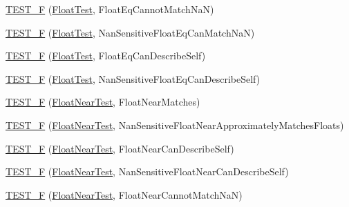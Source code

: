 \begin{DoxyCompactItemize}
\item 
\mbox{\hyperlink{namespacetesting_1_1gmock__matchers__test_a111f0c8a5ec17b47e8eb6226e1c2cb58}{T\+E\+S\+T\+\_\+F}} (\mbox{\hyperlink{namespacetesting_1_1gmock__matchers__test_a145329e433869625f9f0e98a0cdfd7b4}{Float\+Test}}, Float\+Eq\+Cannot\+Match\+NaN)
\item 
\mbox{\hyperlink{namespacetesting_1_1gmock__matchers__test_a4e9d89902e088a10915b4f9463ac0f09}{T\+E\+S\+T\+\_\+F}} (\mbox{\hyperlink{namespacetesting_1_1gmock__matchers__test_a145329e433869625f9f0e98a0cdfd7b4}{Float\+Test}}, Nan\+Sensitive\+Float\+Eq\+Can\+Match\+NaN)
\item 
\mbox{\hyperlink{namespacetesting_1_1gmock__matchers__test_a264de01a5019e5c358116845bf5edd14}{T\+E\+S\+T\+\_\+F}} (\mbox{\hyperlink{namespacetesting_1_1gmock__matchers__test_a145329e433869625f9f0e98a0cdfd7b4}{Float\+Test}}, Float\+Eq\+Can\+Describe\+Self)
\item 
\mbox{\hyperlink{namespacetesting_1_1gmock__matchers__test_a95a2bbc273ff70fc364c5c9c4697834c}{T\+E\+S\+T\+\_\+F}} (\mbox{\hyperlink{namespacetesting_1_1gmock__matchers__test_a145329e433869625f9f0e98a0cdfd7b4}{Float\+Test}}, Nan\+Sensitive\+Float\+Eq\+Can\+Describe\+Self)
\item 
\mbox{\hyperlink{namespacetesting_1_1gmock__matchers__test_a6897409da5003f20f891d8a5ecabdc99}{T\+E\+S\+T\+\_\+F}} (\mbox{\hyperlink{namespacetesting_1_1gmock__matchers__test_a426b51f464dcb48033946e1bf3cc8795}{Float\+Near\+Test}}, Float\+Near\+Matches)
\item 
\mbox{\hyperlink{namespacetesting_1_1gmock__matchers__test_ad396e996ed685fd80cbd78740b8d01a8}{T\+E\+S\+T\+\_\+F}} (\mbox{\hyperlink{namespacetesting_1_1gmock__matchers__test_a426b51f464dcb48033946e1bf3cc8795}{Float\+Near\+Test}}, Nan\+Sensitive\+Float\+Near\+Approximately\+Matches\+Floats)
\item 
\mbox{\hyperlink{namespacetesting_1_1gmock__matchers__test_ad56232046efe7b4d5169a15fd15a2001}{T\+E\+S\+T\+\_\+F}} (\mbox{\hyperlink{namespacetesting_1_1gmock__matchers__test_a426b51f464dcb48033946e1bf3cc8795}{Float\+Near\+Test}}, Float\+Near\+Can\+Describe\+Self)
\item 
\mbox{\hyperlink{namespacetesting_1_1gmock__matchers__test_a4e90d53ea578d6b767559d8615a4c0c2}{T\+E\+S\+T\+\_\+F}} (\mbox{\hyperlink{namespacetesting_1_1gmock__matchers__test_a426b51f464dcb48033946e1bf3cc8795}{Float\+Near\+Test}}, Nan\+Sensitive\+Float\+Near\+Can\+Describe\+Self)
\item 
\mbox{\hyperlink{namespacetesting_1_1gmock__matchers__test_a2cd2ceebefa14a5d564a3bca60ed6572}{T\+E\+S\+T\+\_\+F}} (\mbox{\hyperlink{namespacetesting_1_1gmock__matchers__test_a426b51f464dcb48033946e1bf3cc8795}{Float\+Near\+Test}}, Float\+Near\+Cannot\+Match\+NaN)

\end{DoxyCompactItemize}
